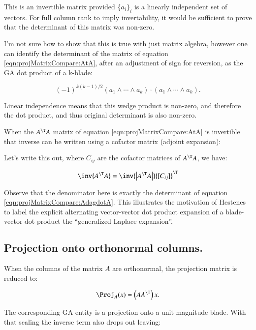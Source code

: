 This is an invertible matrix provided $\{a_i\}_i$ is a linearly independent set of vectors.
For full column rank to imply invertability, it would be sufficient to prove that the 
determinant of this matrix was non-zero.

I'm not sure how to show that this is true with just matrix algebra, however
one can identify the determinant of the matrix of equation \ref{eqn:projMatrixCompare:AtA}, after an adjustment
of sign for reversion, as the GA dot product of a k-blade:

\begin{equation}\label{eqn:projMatrixCompare:AdagdotA}
(-1)^{k(k-1)/2} (a_1 \wedge \cdots \wedge a_k) \cdot (a_1 \wedge \cdots \wedge a_k).
\end{equation}

Linear independence means that this wedge product is non-zero, and therefore the dot product, and thus original determinant is also non-zero.

When the $A^\T A$ matrix of equation \ref{eqn:projMatrixCompare:AtA} is invertible that inverse can be written using a cofactor matrix (adjoint expansion):

Let's write this out, where $C_{ij}$ are the cofactor matrices of $A^\T A$, we have:

\[
\inv{A^\T A} = \inv{ \Abs{ A^\T A } } {[ C_{ij} ]}^\T
\]

Observe that the denominator here is exactly the determinant of equation \ref{eqn:projMatrixCompare:AdagdotA}.  This illustrates
the motivation of Hestenes to label the explicit alternating vector-vector dot product expansion of a 
blade-vector dot product the ``generalized Laplace expansion''.


\subsection{Projection onto orthonormal columns. }

When the 
columns of the matrix $A$ are orthonormal, the projection matrix is reduced to:

\[
\Proj_A(x) = \left( A A^\T \right) x.
\]

The corresponding GA entity is a projection onto a unit magnitude blade.  With that scaling the inverse term also drops out leaving:

